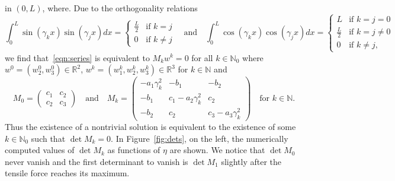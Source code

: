 \documentclass[a4paper,10pt,twoside]{amsbook}
\numberwithin{section}{chapter}
\numberwithin{equation}{chapter}
\theoremstyle{definition}
\begin{document}
in $(0,L)$, where. Due to the orthogonality relations
\[
\int_0^L\sin(\gamma_kx)\sin(\gamma_jx)dx=\begin{cases}
\frac{L}{2} & \text{if $k=j$} \\
0 & \text{if $k\neq j$}
\end{cases}\quad\text{and}\quad\int_0^L\cos(\gamma_kx)\cos(\gamma_jx)dx=\begin{cases}
L & \text{if $k=j=0$} \\
\frac{L}{2} & \text{if $k=j\neq0$} \\
0 & \text{if $k\neq j$},
\end{cases}
\]
we find that~\eqref{eqn:series} is equivalent to $M_kw^k=0$ for all $k\in\mathbb{N}_0$ where $w^0=(w_2^0,w_3^0)\in\mathbb{R}^2$, $w^k=(w_1^k,w_2^k,w_3^k)\in\mathbb{R}^3$ for $k\in\mathbb{N}$ and
\[
M_0=\begin{pmatrix}
c_1 & c_2 \\
c_2 & c_3
\end{pmatrix}\quad\text{and}\quad M_k=\begin{pmatrix}
-a_1\gamma_k^2 & -b_1 & -b_2 \\
-b_1 & c_1-a_2\gamma_k^2 & c_2 \\
-b_2 & c_2 & c_3-a_3\gamma_k^2
\end{pmatrix}\quad\text{for $k\in\mathbb{N}$}.
\]
Thus the existence of a nontrivial solution is equivalent to the existence of some $k\in\mathbb{N}_0$ such that $\det M_k=0$. In Figure~\ref{fig:dets}, on the left, the numerically computed values of $\det M_k$ as functions of $\eta$ are shown. We notice that $\det M_0$ never vanish and the first determinant to vanish is $\det M_1$ slightly after the tensile force reaches its maximum.
\end{document}
